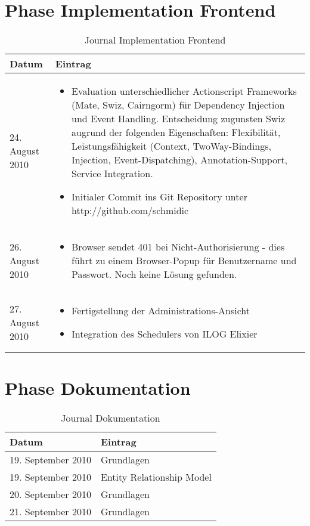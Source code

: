   \section{Phase Implementation Frontend}
  \begin{spacing}{0.5}
  \begin{longtable}{|p{4cm}|p{10cm}|}
      \caption{Journal Implementation Frontend}\\
\hline
  Datum & Eintrag\\
  \hline
  24. August 2010 & 
  \begin{itemize}
  \item Evaluation unterschiedlicher Actionscript Frameworks (Mate, Swiz, Cairngorm) f\"ur Dependency Injection und Event Handling. Entscheidung zugunsten Swiz augrund der folgenden Eigenschaften: Flexibilit\"at, Leistungsf\"ahigkeit (Context, TwoWay-Bindings, Injection, Event-Dispatching), Annotation-Support, Service Integration.
  \item Initialer Commit ins Git Repository unter http://github.com/schmidic
  \end{itemize}\\
  \hline
  
 26. August 2010 & 
  \begin{itemize}
  \item Browser sendet 401 bei Nicht-Authorisierung - dies f\"uhrt zu einem Browser-Popup f\"ur Benutzername und Passwort. Noch keine L\"osung gefunden. 
  \end{itemize}\\
  \hline
  
 27. August 2010 & 
  \begin{itemize}
  \item Fertigstellung der Administrations-Ansicht
  \item Integration des Schedulers von ILOG Elixier
  \end{itemize}\\
  \hline
    \end{longtable}
  \end{spacing}
  
  
    \section{Phase Dokumentation}
  \begin{longtable}{|p{4cm}|p{10cm}|}
      \caption{Journal Dokumentation}\\
\hline
  Datum & Eintrag\\
   \hline
  19. September 2010 & Grundlagen\\\hline
    19. September 2010 & Entity Relationship Model\\\hline
    20. September 2010 & Grundlagen\\\hline
    21. September 2010 & Grundlagen\\\hline
    \end{longtable}
  

